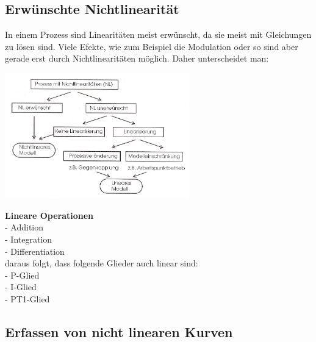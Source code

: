 	\subsection{Erwünschte Nichtlinearität }
		In einem Prozess sind Linearitäten meist erwünscht, da sie meist mit
		Gleichungen zu lösen sind.
		Viele Efekte, wie zum Beispiel die Modulation oder so sind aber gerade erst
		durch Nichtlinearitäten möglich. Daher unterscheidet man:\\
	\begin{minipage}[c]{8cm}
		\includegraphics[width=8cm]{./bilder/Liste_Nichtlinearitaeten.jpg}
	\end{minipage}
	\begin{minipage}[c]{8cm}
		\textbf{Lineare Operationen} \\
		- Addition \\
		- Integration \\
		- Differentiation \\
		daraus folgt, dass folgende Glieder auch linear sind: \\
		- P-Glied \\
		- I-Glied \\
		- PT1-Glied
	\end{minipage}

	\subsection{Erfassen von nicht linearen Kurven}
